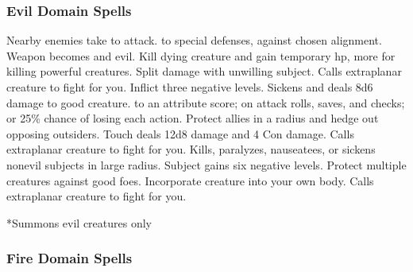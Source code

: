 \subsubsection{Evil Domain Spells}

\begin{spelllist}
     Nearby enemies take  to attack.
      to special defenses,  against chosen alignment.
     Weapon becomes  and evil.
     Kill dying creature and gain temporary hp, more for killing powerful creatures.
     Split damage with unwilling subject.
     Calls extraplanar creature to fight for you.
     Inflict three negative levels.
     Sickens and deals 8d6 damage to good creature.
      to an attribute score;  on attack rolls, saves, and checks; or 25\% chance of losing each action.
     Protect allies in a \areamed radius and hedge out opposing outsiders.
     Touch deals 12d8 damage and 4 Con damage.
     Calls extraplanar creature to fight for you.
     Kills, paralyzes, nauseatees, or sickens nonevil subjects in large radius.
    \spellhead[7]{}
     Subject gains six negative levels.
    \F Protect multiple creatures against good foes. 
     Incorporate creature into your own body.
     Calls extraplanar creature to fight for you.
\end{spelllist}
*Summons evil creatures only

\subsubsection{Fire Domain Spells}

